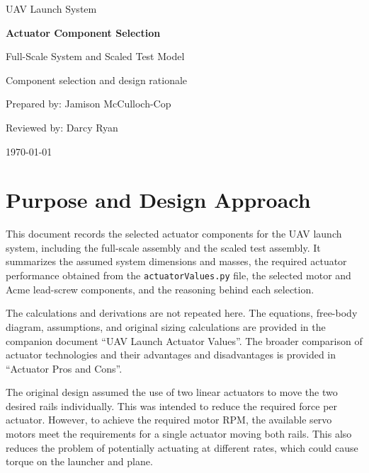 \documentclass[11pt]{article}
\begin{document}

\begin{titlepage}
    \centering
    \vspace*{2.0cm}
    {\Large UAV Launch System\par}
    \vspace{0.6cm}
    {\huge\bfseries Actuator Component Selection\par}
    \vspace{0.35cm}
    {\Large Full-Scale System and Scaled Test Model\par}
    \vspace{1.5cm}
    {\large Component selection and design rationale\par}
    \vfill
    {\large Prepared by: Jamison McCulloch-Cop\par}
    \vspace{0.3cm}
    {\large Reviewed by: Darcy Ryan\par}
    \vspace{0.3cm}
    {\large \today\par}
    \vspace*{1.5cm}
\end{titlepage}

\clearpage
{}

\section{Purpose and Design Approach}

This document records the selected actuator components for the UAV launch
system, including the full-scale assembly and the scaled test assembly. It
summarizes the assumed system dimensions and masses, the required actuator
performance obtained from the \texttt{actuatorValues.py} file, the selected
motor and Acme lead-screw components, and the reasoning behind each selection.

The calculations and derivations are not repeated here. The equations,
free-body diagram, assumptions, and original sizing calculations are provided
in the companion document ``UAV Launch Actuator Values''. The broader
comparison of actuator technologies and their advantages and disadvantages
is provided in ``Actuator Pros and Cons''.

The original design assumed the use of two linear actuators
to move the two desired rails individually. This was intended to reduce the
required force per actuator. However, to achieve the required motor RPM,
the available servo motors meet the requirements for a single actuator moving
both rails. This also reduces the problem of potentially actuating at
different rates, which could cause torque on the launcher and plane.
\end{document}
